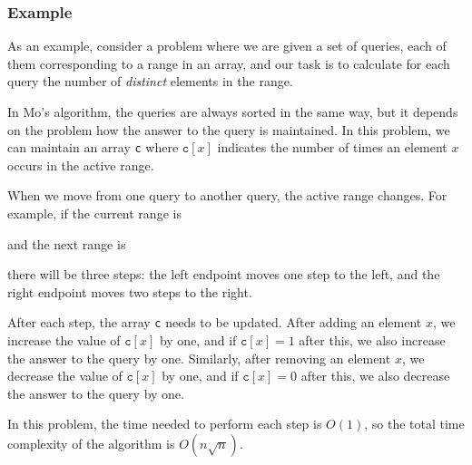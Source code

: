 \subsubsection*{Example}

As an example, consider a problem
where we are given a set of queries,
each of them corresponding to a range in an array,
and our task is to calculate for each query
the number of \emph{distinct} elements in the range.

In Mo's algorithm, the queries are always sorted
in the same way, but it depends on the problem
how the answer to the query is maintained.
In this problem, we can maintain an array 
\texttt{c} where $\texttt{c}[x]$
indicates the number of times an element $x$
occurs in the active range.

When we move from one query to another query,
the active range changes.
For example, if the current range is
\begin{center}
\end{center}
and the next range is
\begin{center}
\end{center}
there will be three steps:
the left endpoint moves one step to the left,
and the right endpoint moves two steps to the right.

After each step, the array \texttt{c}
needs to be updated.
After adding an element $x$,
we increase the value of 
$\texttt{c}[x]$ by one,
and if $\texttt{c}[x]=1$ after this,
we also increase the answer to the query by one.
Similarly, after removing an element $x$,
we decrease the value of 
$\texttt{c}[x]$ by one,
and if $\texttt{c}[x]=0$ after this,
we also decrease the answer to the query by one.

In this problem, the time needed to perform
each step is $O(1)$, so the total time complexity
of the algorithm is $O(n \sqrt n)$.